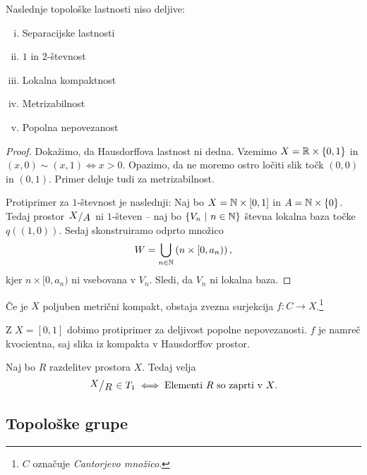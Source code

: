 \begin{trditev}
Naslednje topološke lastnosti niso deljive:

\begin{multicols}{2}
\begin{enumerate}[i)]
\item Separacijske lastnosti
\item $1$ in $2$-števnost
\item Lokalna kompaktnost
\item Metrizabilnost
\item Popolna nepovezanost
\end{enumerate}
\end{multicols}
\end{trditev}

\begin{proof}
Dokažimo, da Hausdorffova lastnost ni dedna. Vzemimo
$X = \mathbb{R} \times \left\{0, 1\right\}$ in $(x,0) \sim (x,1) \iff x > 0$.
Opazimo, da ne moremo ostro ločiti slik točk $(0,0)$ in $(0,1)$.
Primer deluje tudi za metrizabilnost.

Protiprimer za $1$-števnost je naslednji: Naj bo
$X = \mathbb{N} \times [0,1]$ in $A = \mathbb{N} \times \left\{0\right\}$. Tedaj prostor
$\kvoc{X}{A}$ ni $1$-števen -- naj bo $\left\{V_n~\middle\vert~n \in \mathbb{N}\right\}$ števna
lokalna baza točke $q((1,0))$. Sedaj skonstruiramo odprto množico
\[
W = \bigcup_{n \in \mathbb{N}} \left(n \times [0, a_n)\right),
\]
kjer $n \times [0, a_n)$ ni vsebovana v $V_n$. Sledi, da $V_n$ ni
lokalna baza.
\end{proof}

\begin{izrek}[Aleksandrov]
Če je $X$ poljuben metrični kompakt, obstaja zvezna surjekcija
$f \colon C \to X$.\footnote{$C$ označuje \emph{Cantorjevo
množico}.}
\end{izrek}

\begin{opomba}
Z $X = [0, 1]$ dobimo protiprimer za deljivost popolne
nepovezanosti. $f$ je namreč kvocientna, saj slika iz kompakta v
Hausdorffov prostor.
\end{opomba}

\begin{trditev}
Naj bo $R$ razdelitev prostora $X$. Tedaj velja
\[
\kvoc{X}{R} \in T_1 \iff \text{Elementi $R$ so zaprti v $X$}.
\]
\end{trditev}

\obvs

\newpage

\subsection{Topološke grupe}

